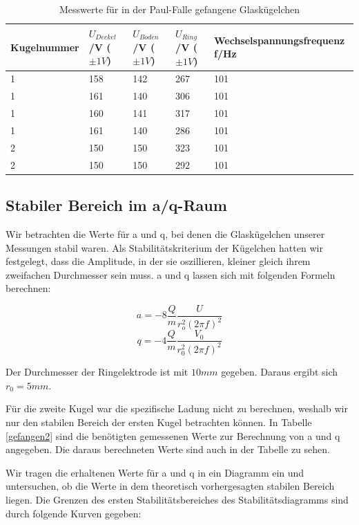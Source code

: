 \documentclass[10pt,a4paper]{article}
\begin{document}
\begin{table}[h!]
	\centering
	\begin{tabular}{|l|l|l|l|l|}\hline
		Kugelnummer & $U_{Deckel}$/V ($\pm 1V$)& $U_{Boden}$/V ($\pm 1V$)& $U_{Ring}$/V ($\pm 1V$)& Wechselspannungsfrequenz f/Hz\\\hline
		1 & 158 & 142 & 267 & 101\\
		1 & 161 & 140 & 306 & 101\\
		1 & 160 & 141 & 317 & 101\\
		1 & 161 & 140 & 286 & 101\\
		2 & 150 & 150 & 323 & 101\\
		2 & 150 & 150 & 292 & 101\\\hline
	\end{tabular}
	\caption{Messwerte für in der Paul-Falle gefangene Glaskügelchen}
	\label{gefangen}
\end{table}

\subsection{Stabiler Bereich im a/q-Raum}

Wir betrachten die Werte für a und q, bei denen die Glaskügelchen unserer Messungen stabil waren. Als Stabilitätskriterium der Kügelchen hatten wir festgelegt, dass die Amplitude, in der sie oszillieren, kleiner gleich ihrem zweifachen Durchmesser sein muss. a und q lassen sich mit folgenden Formeln berechnen:

\begin{equation}
	a = -8 \frac{Q}{m} \frac{U}{r_o^2 (2 \pi f)^2}
\end{equation}
\begin{equation}
	q = -4 \frac{Q}{m} \frac{V_0}{r_0^2 (2\pi f)^2}
\end{equation}

Der Durchmesser der Ringelektrode ist mit $10mm$ gegeben. Daraus ergibt sich $r_0 = 5mm$.

Für die zweite Kugel war die spezifische Ladung nicht zu berechnen, weshalb wir nur den stabilen Bereich der ersten Kugel betrachten können. In Tabelle \ref{gefangen2} sind die benötigten gemessenen Werte zur Berechnung von a und q angegeben. Die daraus berechneten Werte sind auch in der Tabelle zu sehen. 

Wir tragen die erhaltenen Werte für a und q in ein Diagramm ein und untersuchen, ob die Werte in dem theoretisch vorhergesagten stabilen Bereich liegen. Die Grenzen des ersten Stabilitätsbereiches des Stabilitätsdiagramms sind durch folgende Kurven gegeben:
\end{document}
